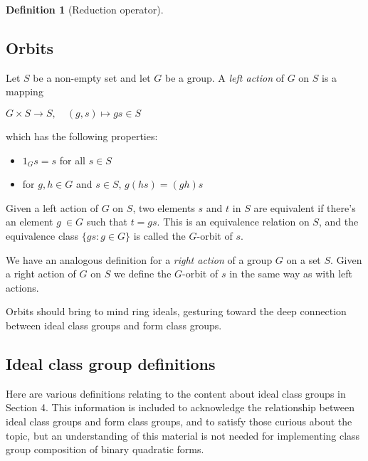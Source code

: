 \documentclass{article}
\theoremstyle{definition}
\newtheorem{definition}{Definition}[section]
\theoremstyle{theorem}
\theoremstyle{example}
\theoremstyle{corollary}
\begin{document}
\begin{definition}[Reduction operator]
\bigskip

\subsection{Orbits}

\bigskip

Let \(S\) be a non-empty set and let \(G\) be a group. A \textit{left action} of \(G\) on \(S\) is a mapping
\begin{center}
\(G \times S \rightarrow S, \quad (g, s) \mapsto gs \in S\)
\end{center}
which has the following properties:
\begin{itemize}
\item \(1_{G} s = s\) for all \(s \in S\)
\item for \(g, h \in G\) and \(s \in S\), \(g(hs) = (gh)s\)
\end{itemize}

\bigskip

Given a left action of \(G\) on \(S\), two elements \(s\) and \(t\) in \(S\) are equivalent if there's an element \(g \ \in G\) such that \(t = gs\). This is an equivalence relation on \(S\), and the equivalence class \(\{gs : g \in G \}\) is called the \(G\)-orbit of \(s\).

\bigskip

We have an analogous definition for a \textit{right action} of a group \(G\) on a set \(S\). Given a right action of \(G\) on \(S\) we define the \(G\)-orbit of \(s\) in the same way as with left actions.

\bigskip

Orbits should bring to mind ring ideals, gesturing toward the deep connection between ideal class groups and form class groups.

\bigskip

\subsection{Ideal class group definitions}

\bigskip

Here are various definitions relating to the content about ideal class groups in Section 4. This information is included to acknowledge the relationship between ideal class groups and form class groups, and to satisfy those curious about the topic, but an understanding of this material is not needed for implementing class group composition of binary quadratic forms.


\end{definition}
\end{document}
